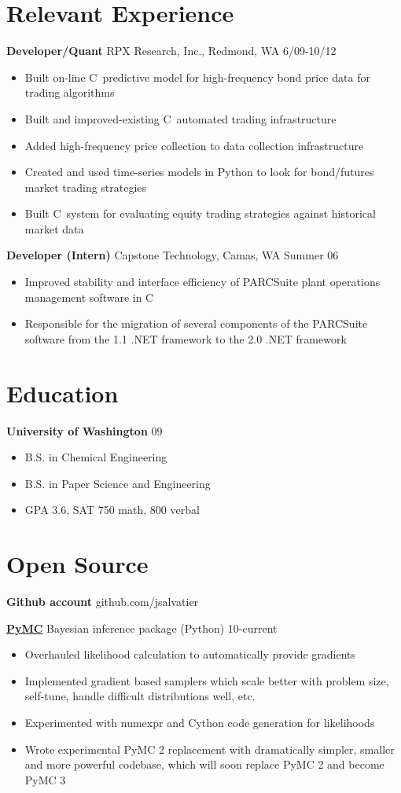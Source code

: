 \documentclass[margin]{res}
\newcommand{\bactivity}[3]{
  {\bf #1} #2 \hfill #3
    \vspace{6pt}
    \begin{itemize} \itemsep -2pt
      }
\newcommand{\eactivity}[0]{\end{itemize}}
\newcommand{\CS}
{C\nolinebreak[4]\hspace{-.05em}\raisebox{.22ex}{\footnotesize\bf \#}}
\begin{document}
 
 
\begin{resume} 
 

\section{Relevant Experience}
  \bactivity{Developer/Quant}{RPX Research, Inc., Redmond, WA}{6/09-10/12}
     \item Built on-line \CS\ predictive model for high-frequency bond price data for trading algorithms
     \item Built and improved-existing \CS\ automated trading infrastructure  
     \item Added high-frequency price collection to data collection infrastructure
     \item Created and used time-series models in Python to look for bond/futures market trading strategies 
     \item Built \CS\ system for evaluating equity trading strategies against historical market data 
  \eactivity

    \bactivity{Developer (Intern)}{Capstone Technology, Camas, WA}{Summer 06}
    \item Improved stability and interface efficiency of PARCSuite plant operations management software in \CS\
    \item Responsible for the migration of several components of the PARCSuite software from the 1.1 .NET framework to the 2.0 .NET framework 
  \eactivity

 \section{Education} 
  \bactivity{University of Washington}{}{09}
      \item B.S. in Chemical Engineering
      \item B.S. in Paper Science and Engineering
      \item GPA 3.6, SAT 750 math, 800 verbal
  \eactivity
  
 \section{Open Source}
    {\bf Github account} github.com/jsalvatier 

    \bactivity{\href{https://github.com/pymc-devs/pymc\#readme}{PyMC} }{Bayesian inference package (Python)}{10-current}
      \item Overhauled likelihood calculation to automatically provide gradients 
      \item Implemented gradient based samplers which scale better with problem size, self-tune, handle difficult distributions well, etc.
      \item Experimented with numexpr and Cython code generation for likelihoods
      \item Wrote experimental PyMC 2 replacement with dramatically simpler, smaller and more powerful codebase, which will soon replace PyMC 2 and become PyMC 3
    \eactivity


\end{resume}
\end{document}
